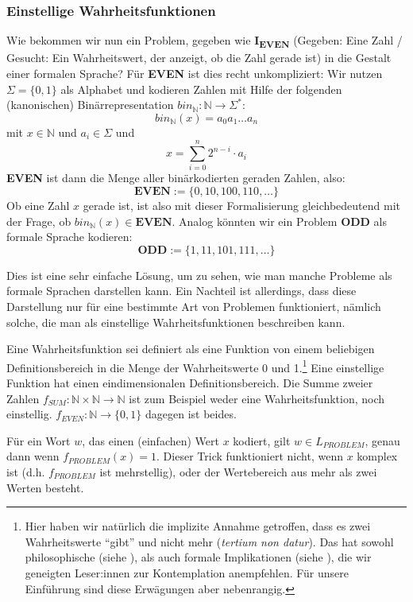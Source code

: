 \subsubsection{Einstellige Wahrheitsfunktionen}
Wie bekommen wir nun ein Problem, gegeben wie \textbf{I\textsubscript{EVEN}} 
(Gegeben: Eine Zahl / Gesucht: Ein Wahrheitswert, der anzeigt, ob die Zahl gerade ist)
in die Gestalt einer formalen Sprache?
Für \textbf{EVEN} ist dies recht unkompliziert:
Wir nutzen $\Sigma = \{0,1\}$ als Alphabet
und kodieren Zahlen mit Hilfe der folgenden (kanonischen) Binärrepresentation
$bin_{\mathbb{N}}: \mathbb{N} \rightarrow \Sigma^*$:
\[
    bin_{\mathbb{N}}(x) = a_{0}a_{1} \ldots a_{n}
\]
mit $x \in \mathbb{N}$ und $a_i \in \Sigma$ und 
\[
    x = \sum_{i=0}^n 2^{n-i} \cdot a_i
\]
\textbf{EVEN} ist dann die Menge aller binärkodierten geraden Zahlen, also:
\[
    \mathbf{EVEN} := \{0, 10, 100, 110, \ldots\}
\]
Ob eine Zahl $x$ gerade ist, ist also mit dieser Formalisierung gleichbedeutend mit der Frage,
ob $bin_{\mathbb{N}}(x) \in \mathbf{EVEN}$.
Analog könnten wir ein Problem \textbf{ODD} als formale Sprache kodieren:
\[
    \mathbf{ODD} := \{1, 11, 101, 111, \ldots \}
\]

Dies ist eine sehr einfache Lösung, um zu sehen,
wie man manche Probleme als formale Sprachen darstellen kann.
Ein Nachteil ist allerdings, dass diese Darstellung
nur für eine bestimmte Art von Problemen funktioniert,
nämlich solche, die man als einstellige Wahrheitsfunktionen beschreiben kann.


Eine Wahrheitsfunktion sei definiert als eine Funktion von einem beliebigen Definitionsbereich
in die Menge der Wahrheitswerte 0 und 1.\footnote{
    Hier haben wir natürlich die implizite Annahme getroffen,
    dass es zwei Wahrheitswerte ``gibt'' und nicht mehr (\emph{tertium non datur}).
    Das hat sowohl philosophische (siehe \cite{sep-logic-manyvalued}), als auch formale Implikationen (siehe \cite{gottwald}),
    die wir geneigten Leser:innen zur Kontemplation anempfehlen.
    Für unsere Einführung sind diese Erwägungen aber nebenrangig.
}
Eine einstellige Funktion hat einen eindimensionalen Definitionsbereich.
Die Summe zweier Zahlen $f_{SUM}: \mathbb{N} \times \mathbb{N} \rightarrow \mathbb{N}$
ist zum Beispiel weder eine Wahrheitsfunktion,
noch einstellig.
$f_{EVEN}: \mathbb{N} \rightarrow \{0,1\}$ dagegen ist beides.

Für ein Wort $w$, das einen (einfachen) Wert $x$ kodiert,
gilt $w \in L_{PROBLEM}$, genau dann wenn $f_{PROBLEM}(x) = 1$.
Dieser Trick funktioniert nicht,
wenn $x$ komplex ist (d.h. $f_{PROBLEM}$ ist mehrstellig),
oder der Wertebereich aus mehr als zwei Werten besteht.

